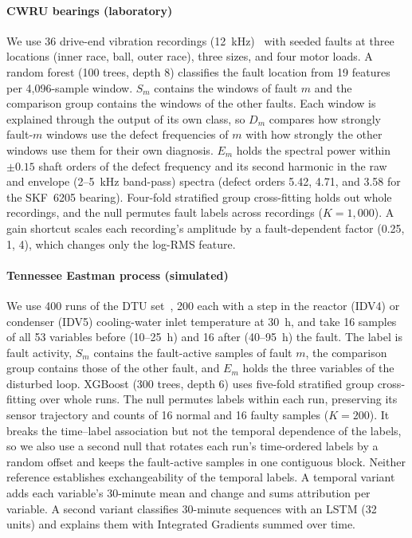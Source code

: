 \documentclass[conference]{IEEEtran}
\begin{document}
\paragraph{CWRU bearings (laboratory)} We use 36 drive-end vibration recordings (12~kHz)~\cite{cwru_data} with seeded faults at three locations (inner race, ball, outer race), three sizes, and four motor loads. A random forest (100 trees, depth 8) classifies the fault location from 19 features per 4{,}096-sample window. $S_m$ contains the windows of fault $m$ and the comparison group contains the windows of the other faults. Each window is explained through the output of its own class, so $D_m$ compares how strongly fault-$m$ windows use the defect frequencies of $m$ with how strongly the other windows use them for their own diagnosis. $E_m$ holds the spectral power within $\pm0.15$ shaft orders of the defect frequency and its second harmonic in the raw and envelope (2--5~kHz band-pass) spectra (defect orders 5.42, 4.71, and 3.58 for the SKF~6205 bearing). Four-fold stratified group cross-fitting holds out whole recordings, and the null permutes fault labels across recordings ($K=1{,}000$). A gain shortcut scales each recording's amplitude by a fault-dependent factor (0.25, 1, 4), which changes only the log-RMS feature.

\paragraph{Tennessee Eastman process (simulated)} We use 400 runs of the DTU set~\cite{reinartz2021tep}, 200 each with a step in the reactor (IDV4) or condenser (IDV5) cooling-water inlet temperature at 30~h, and take 16 samples of all 53 variables before (10--25~h) and 16 after (40--95~h) the fault. The label is fault activity, $S_m$ contains the fault-active samples of fault $m$, the comparison group contains those of the other fault, and $E_m$ holds the three variables of the disturbed loop. XGBoost (300 trees, depth 6) uses five-fold stratified group cross-fitting over whole runs. The null permutes labels within each run, preserving its sensor trajectory and counts of 16 normal and 16 faulty samples ($K=200$). It breaks the time--label association but not the temporal dependence of the labels, so we also use a second null that rotates each run's time-ordered labels by a random offset and keeps the fault-active samples in one contiguous block. Neither reference establishes exchangeability of the temporal labels. A temporal variant adds each variable's 30-minute mean and change and sums attribution per variable. A second variant classifies 30-minute sequences with an LSTM (32 units) and explains them with Integrated Gradients summed over time.
\end{document}
